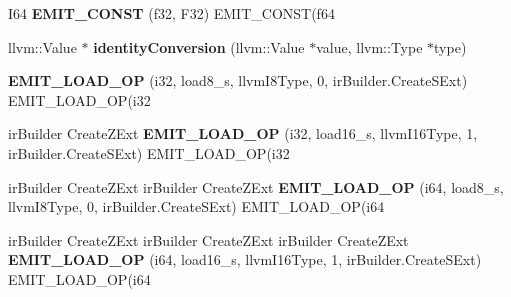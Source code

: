 \begin{DoxyCompactItemize}
\item 
\mbox{\label{struct_l_l_v_m_j_i_t_1_1_emit_function_context_afbe74a95536e59f4888c85a2d8ba95c1}} 
I64 {\bfseries E\+M\+I\+T\+\_\+\+C\+O\+N\+ST} (f32, F32) E\+M\+I\+T\+\_\+\+C\+O\+N\+ST(f64
\item 
\mbox{\label{struct_l_l_v_m_j_i_t_1_1_emit_function_context_a8ac110f59dc7c48c379197c9b2bb79b5}} 
llvm\+::\+Value $\ast$ {\bfseries identity\+Conversion} (llvm\+::\+Value $\ast$value, llvm\+::\+Type $\ast$type)
\item 
\mbox{\label{struct_l_l_v_m_j_i_t_1_1_emit_function_context_aa6a7ab87b261db9a22776d31c96f23af}} 
{\bfseries E\+M\+I\+T\+\_\+\+L\+O\+A\+D\+\_\+\+OP} (i32, load8\+\_\+s, llvm\+I8\+Type, 0, ir\+Builder.\+Create\+S\+Ext) E\+M\+I\+T\+\_\+\+L\+O\+A\+D\+\_\+\+OP(i32
\item 
\mbox{\label{struct_l_l_v_m_j_i_t_1_1_emit_function_context_a0c44c2f5684d318248088a5ffe9b97c4}} 
ir\+Builder Create\+Z\+Ext {\bfseries E\+M\+I\+T\+\_\+\+L\+O\+A\+D\+\_\+\+OP} (i32, load16\+\_\+s, llvm\+I16\+Type, 1, ir\+Builder.\+Create\+S\+Ext) E\+M\+I\+T\+\_\+\+L\+O\+A\+D\+\_\+\+OP(i32
\item 
\mbox{\label{struct_l_l_v_m_j_i_t_1_1_emit_function_context_a9dcdbae79459d63bcac36ae88c744c23}} 
ir\+Builder Create\+Z\+Ext ir\+Builder Create\+Z\+Ext {\bfseries E\+M\+I\+T\+\_\+\+L\+O\+A\+D\+\_\+\+OP} (i64, load8\+\_\+s, llvm\+I8\+Type, 0, ir\+Builder.\+Create\+S\+Ext) E\+M\+I\+T\+\_\+\+L\+O\+A\+D\+\_\+\+OP(i64
\item 
\mbox{\label{struct_l_l_v_m_j_i_t_1_1_emit_function_context_af2ab2a5419c87e7a6dfd030a8bdb0267}} 
ir\+Builder Create\+Z\+Ext ir\+Builder Create\+Z\+Ext ir\+Builder Create\+Z\+Ext {\bfseries E\+M\+I\+T\+\_\+\+L\+O\+A\+D\+\_\+\+OP} (i64, load16\+\_\+s, llvm\+I16\+Type, 1, ir\+Builder.\+Create\+S\+Ext) E\+M\+I\+T\+\_\+\+L\+O\+A\+D\+\_\+\+OP(i64
\item 
\mbox{\label{struct_l_l_v_m_j_i_t_1_1_emit_function_context_a6b20f21fdd183ec34d9ac8832e26c70f}} 

\end{DoxyCompactItemize}
